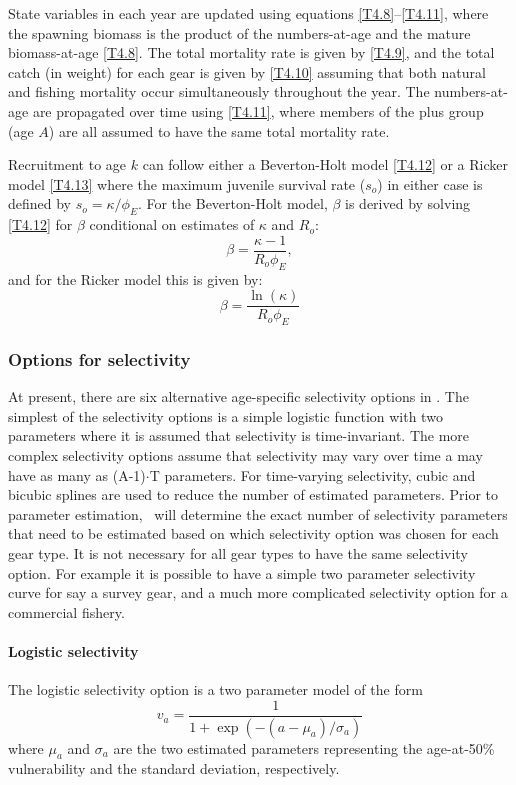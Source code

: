 State variables in each year are updated using equations \ref{T4.8}--\ref{T4.11}, where the spawning biomass is the product of the numbers-at-age and the mature biomass-at-age \eqref{T4.8}.  The total mortality rate is given by \eqref{T4.9}, and the total catch (in weight) for each gear is given by \eqref{T4.10} assuming that both natural and fishing mortality occur simultaneously throughout the year.  The numbers-at-age are propagated over time using \eqref{T4.11}, where members of the plus group (age $A$) are all assumed to have the same total mortality rate.  

Recruitment to age $k$ can follow either a Beverton-Holt model \eqref{T4.12} or a Ricker model \eqref{T4.13} where the maximum juvenile survival rate ($s_o$) in either case is defined by $s_o=\kappa/\phi_E$.  For the Beverton-Holt model, $\beta$ is derived by solving \eqref{T4.12} for $\beta$ conditional on estimates of $\kappa$ and $R_o$:
\[
\beta = \frac{\kappa-1}{R_o \phi_E},
\]
and for the Ricker model this is given by:
\[
\beta = \frac{\ln(\kappa)}{R_o \phi_E}
\]


		
		\subsubsection{Options for selectivity}
		
At present, there are six alternative age-specific selectivity options in \iscam.  The simplest of the selectivity options is a simple logistic function with two parameters where it is assumed that selectivity is time-invariant.  The more complex selectivity options assume that selectivity may vary over time a may have as many as (A-1)$\cdot$T parameters.  For time-varying selectivity, cubic and bicubic splines are used to reduce the number of estimated parameters.  Prior to parameter estimation, \iscam\ will determine the exact number of selectivity parameters that need to be estimated based on which selectivity option was chosen for each gear type.  It is not necessary for all gear types to have the same selectivity option.  For example it is possible to have a simple two parameter selectivity curve for say a survey gear, and a much more complicated selectivity option for a commercial fishery.

\paragraph{Logistic selectivity} 
The logistic selectivity option is a two parameter model of the form
\[
v_a = \frac{1}{1+ \exp{(-(a-\mu_{a})/\sigma_a)}}
\]
where $\mu_a$ and $\sigma_a$ are the two estimated parameters representing the age-at-50\% vulnerability and the standard deviation, respectively.

